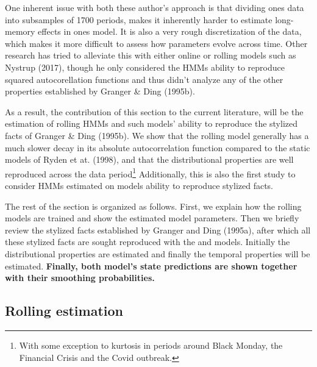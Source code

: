 One inherent issue with both these author's approach is that dividing ones data into subsamples of 1700 periods, makes it inherently harder to estimate long-memory effects in ones model. It is also a very rough discretization of the data, which makes it more difficult to assess how parameters evolve across time. Other research has tried to alleviate this with either online or rolling models such as Nystrup (2017), though he only considered the HMMs ability to reproduce squared autocorellation functions and thus didn't analyze any of the other properties established by Granger \& Ding (1995b).

As a result, the contribution of this section to the current literature, will be the estimation of rolling HMMs and such models' ability to reproduce the stylized facts of Granger \& Ding (1995b). We show that the rolling model generally has a much slower decay in its absolute autocorrelation function compared to the static models of Ryden et at. (1998), and that the distributional properties are well reproduced across the data period\footnote{
With some exception to kurtosis in periods around Black Monday, the Financial Crisis and the Covid outbreak.
}
Additionally, this is also the first study to consider HMMs estimated on \jump models ability to reproduce stylized facts.

The rest of the section is organized as follows. First, we explain how the rolling models are trained and show the estimated model parameters. Then we briefly review the stylized facts established by Granger and Ding (1995a), after which all these stylized facts are sought reproduced with the \mle and \jump models. Initially the distributional properties are estimated and finally the temporal properties will be estimated. \textbf{Finally, both model's state predictions are shown together with their smoothing probabilities.}

\subsection{Rolling estimation}
\label{Sec: rolling estimation}

